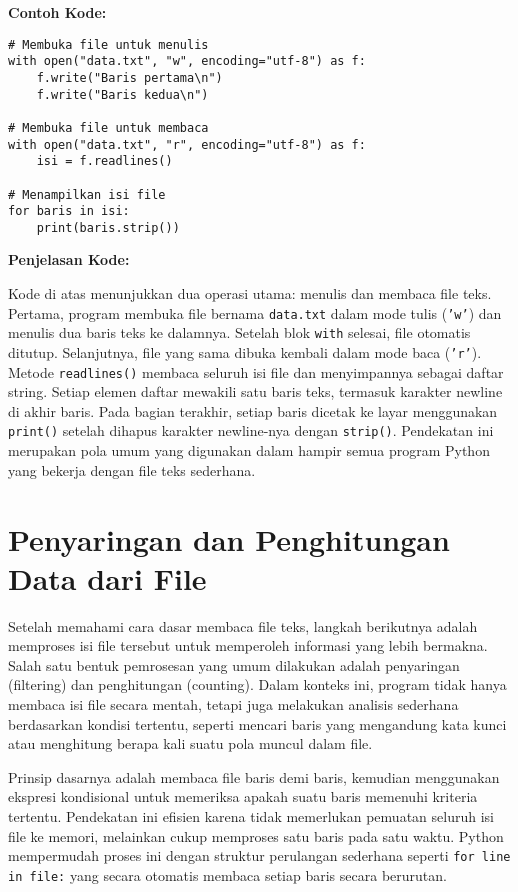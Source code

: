 \noindent\textbf{Contoh Kode:}

\begin{lstlisting}[style=PythonStyle, caption={Contoh Membaca dan Menulis File Teks di Python}]
# Membuka file untuk menulis
with open("data.txt", "w", encoding="utf-8") as f:
    f.write("Baris pertama\n")
    f.write("Baris kedua\n")

# Membuka file untuk membaca
with open("data.txt", "r", encoding="utf-8") as f:
    isi = f.readlines()

# Menampilkan isi file
for baris in isi:
    print(baris.strip())
\end{lstlisting}

\noindent\textbf{Penjelasan Kode:}

Kode di atas menunjukkan dua operasi utama: menulis dan membaca file teks. Pertama, program membuka file bernama \texttt{data.txt} dalam mode tulis (\texttt{'w'}) dan menulis dua baris teks ke dalamnya. Setelah blok \texttt{with} selesai, file otomatis ditutup. Selanjutnya, file yang sama dibuka kembali dalam mode baca (\texttt{'r'}). Metode \texttt{readlines()} membaca seluruh isi file dan menyimpannya sebagai daftar string. Setiap elemen daftar mewakili satu baris teks, termasuk karakter newline di akhir baris. Pada bagian terakhir, setiap baris dicetak ke layar menggunakan \texttt{print()} setelah dihapus karakter newline-nya dengan \texttt{strip()}. Pendekatan ini merupakan pola umum yang digunakan dalam hampir semua program Python yang bekerja dengan file teks sederhana.


\section{Penyaringan dan Penghitungan Data dari File}

Setelah memahami cara dasar membaca file teks, langkah berikutnya adalah memproses isi file tersebut untuk memperoleh informasi yang lebih bermakna. Salah satu bentuk pemrosesan yang umum dilakukan adalah penyaringan (filtering) dan penghitungan (counting). Dalam konteks ini, program tidak hanya membaca isi file secara mentah, tetapi juga melakukan analisis sederhana berdasarkan kondisi tertentu, seperti mencari baris yang mengandung kata kunci atau menghitung berapa kali suatu pola muncul dalam file.

Prinsip dasarnya adalah membaca file baris demi baris, kemudian menggunakan ekspresi kondisional untuk memeriksa apakah suatu baris memenuhi kriteria tertentu. Pendekatan ini efisien karena tidak memerlukan pemuatan seluruh isi file ke memori, melainkan cukup memproses satu baris pada satu waktu. Python mempermudah proses ini dengan struktur perulangan sederhana seperti \texttt{for line in file:} yang secara otomatis membaca setiap baris secara berurutan.

